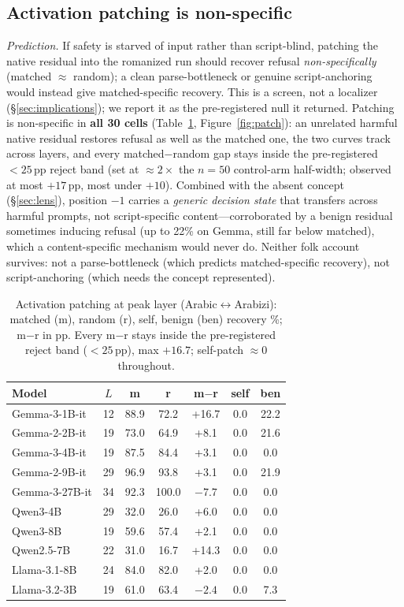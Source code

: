 \documentclass[11pt]{article}
\newcommand{\pp}{\,pp}
\begin{document}
\subsection{Activation patching is non-specific}
\label{sec:patch}
\emph{Prediction.} If safety is starved of input rather than script-blind, patching the native residual into the romanized run should recover refusal \emph{non-specifically} (matched $\approx$ random); a clean parse-bottleneck or genuine script-anchoring would instead give matched-specific recovery. This is a screen, not a localizer (\S\ref{sec:implications}); we report it as the pre-registered null it returned. Patching is non-specific in \textbf{all 30 cells} (Table~\ref{tab:patch}, Figure~\ref{fig:patch}): an unrelated harmful native residual restores refusal as well as the matched one, the two curves track across layers, and every matched$-$random gap stays inside the pre-registered ${<}25$\pp{} reject band (set at ${\approx}2\times$ the $n{=}50$ control-arm half-width; observed at most ${+}17$\pp, most under ${+}10$). Combined with the absent concept (\S\ref{sec:lens}), position $-1$ carries a \emph{generic decision state} that transfers across harmful prompts, not script-specific content---corroborated by a benign residual sometimes inducing refusal (up to 22\% on Gemma, still far below matched), which a content-specific mechanism would never do. Neither folk account survives: not a parse-bottleneck (which predicts matched-specific recovery), not script-anchoring (which needs the concept represented).

\begin{table}[t]
\centering
\small
\begin{tabular}{lcccccc}
\toprule
Model & $L$ & m & r & m$-$r & self & ben \\
\midrule
Gemma-3-1B-it & 12 & 88.9 & 72.2 & +16.7 & 0.0 & 22.2 \\
Gemma-2-2B-it & 19 & 73.0 & 64.9 & +8.1 & 0.0 & 21.6 \\
Gemma-3-4B-it & 19 & 87.5 & 84.4 & +3.1 & 0.0 & 0.0 \\
Gemma-2-9B-it & 29 & 96.9 & 93.8 & +3.1 & 0.0 & 21.9 \\
Gemma-3-27B-it & 34 & 92.3 & 100.0 & $-7.7$ & 0.0 & 0.0 \\
Qwen3-4B & 29 & 32.0 & 26.0 & +6.0 & 0.0 & 0.0 \\
Qwen3-8B & 19 & 59.6 & 57.4 & +2.1 & 0.0 & 0.0 \\
Qwen2.5-7B & 22 & 31.0 & 16.7 & +14.3 & 0.0 & 0.0 \\
Llama-3.1-8B & 24 & 84.0 & 82.0 & +2.0 & 0.0 & 0.0 \\
Llama-3.2-3B & 19 & 61.0 & 63.4 & $-2.4$ & 0.0 & 7.3 \\
\bottomrule
\end{tabular}
\caption{Activation patching at peak layer (Arabic$\leftrightarrow$Arabizi): matched (m), random (r), self, benign (ben) recovery \%; m$-$r in pp. Every m$-$r stays inside the pre-registered reject band ($<25$\pp), max $+16.7$; self-patch $\approx 0$ throughout.}
\label{tab:patch}
\end{table}
\end{document}

